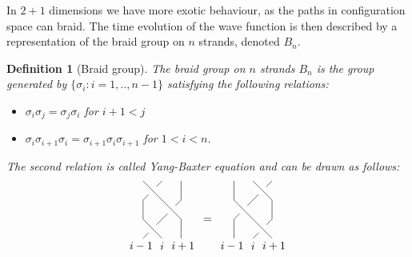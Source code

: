 \documentclass{article}
\newtheorem{definition}{Definition}
\begin{document}
In $2+1$ dimensions we have more exotic behaviour, as the paths in configuration space can braid. The time evolution of the wave function is then described by a representation of the braid group on $n$ strands, denoted $B_n$.
\begin{definition}[Braid group]
	The braid group on $n$ strands $B_n$ is the group generated by $\{ \sigma_i: i=1,..,n-1\}$  satisfying the following relations:
	\begin{itemize}
		\item $\sigma_i \sigma_j = \sigma_j \sigma_i$ for $i+1 < j$
		\item $ \sigma_i \sigma_{i+1} \sigma_i = \sigma_{i+1} \sigma_i \sigma_{i+1}$ for $1 < i < n$.
	\end{itemize}
	 The second relation is called Yang-Baxter equation and can be drawn as follows:
\begin{equation}
\begin{gathered}
\begin{tikzpicture}[scale=0.6]
\node (0) at (0.5,0.5) {};
\node (1) at (-0.1,-0.4) {$i-1$};
\node (2) at (1,-0.4) {$i$};
\node (3) at (2.1,-0.4) {$i+1$};
\node (4) at (1.5,1.5) {};
\node (5) at (0.5,2.5) {};
\draw (0,0)--(0)--(1,1)--(4)--(2,2)--(2,3);
\draw (1,0)--(0,1)--(0,2)--(5)--(1,3);
\draw (2,0)--(2,1)--(0,3);
\end{tikzpicture}
\end{gathered}
\, = \,
\begin{gathered}
\begin{tikzpicture}[scale=0.6]
\node (0) at (1.5,0.5) {};
\node (1) at (-0.1,-0.4) {$i-1$};
\node (2) at (1,-0.4) {$i$};
\node (3) at (2.1,-0.4) {$i+1$};
\node (4) at (0.5,1.5) {};
\node (5) at (1.5,2.5) {};
\draw (2,0)--(1,1)--(0,2)--(0,3);
\draw (1,0)--(0)--(2,1)--(2,2)--(1,3);
\draw (0,0)--(0,1)--(4)--(5)--(2,3);
\end{tikzpicture}
\end{gathered}
\end{equation}
\end{definition}
\end{document}
